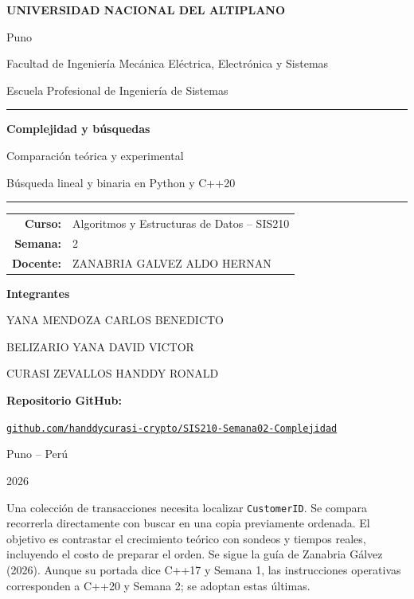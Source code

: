 \documentclass[10pt,a4paper]{article}
\newcommand{\titulo}[1]{\vspace{3pt}{\large\bfseries\color{azul}#1}\par}
\begin{document}
\hypersetup{pageanchor=false}
\begin{titlepage}
\centering
{\Large\bfseries UNIVERSIDAD NACIONAL DEL ALTIPLANO\par}
\vspace{0.25cm}
{\large Puno\par}
\vspace{0.7cm}
Facultad de Ingeniería Mecánica Eléctrica, Electrónica y Sistemas\par
Escuela Profesional de Ingeniería de Sistemas\par
\vspace{2.2cm}
{\color{azul}\rule{\textwidth}{1.2pt}}\par
\vspace{0.5cm}
{\Huge\bfseries\color{azul}Complejidad y búsquedas\par}
\vspace{0.5cm}
{\Large Comparación teórica y experimental\par}
{\large Búsqueda lineal y binaria en Python y C++20\par}
\vspace{0.5cm}
{\color{azul}\rule{\textwidth}{1.2pt}}\par
\vspace{1.5cm}
\begin{tabular}{rl}
\textbf{Curso:}&Algoritmos y Estructuras de Datos -- SIS210\\[6pt]
\textbf{Semana:}&2\\[6pt]
\textbf{Docente:}&ZANABRIA GALVEZ ALDO HERNAN
\end{tabular}
\vspace{1.1cm}
\par\textbf{Integrantes}\par
YANA MENDOZA CARLOS BENEDICTO\par
BELIZARIO YANA DAVID VICTOR\par
CURASI ZEVALLOS HANDDY RONALD\par
\vspace{0.8cm}
\textbf{Repositorio GitHub:}\par
\href{https://github.com/handdycurasi-crypto/SIS210-Semana02-Complejidad}{\texttt{github.com/handdycurasi-crypto/SIS210-Semana02-Complejidad}}\par
\vfill
{\large Puno -- Perú\par 2026\par}
\end{titlepage}
\setcounter{page}{1}
\hypersetup{pageanchor=true}
\titulo{1. Problema y objetivo}
Una colección de transacciones necesita localizar \texttt{CustomerID}. Se compara recorrerla directamente con buscar en una copia previamente ordenada. El objetivo es contrastar el crecimiento teórico con sondeos y tiempos reales, incluyendo el costo de preparar el orden. Se sigue la guía de Zanabria Gálvez (2026). Aunque su portada dice C++17 y Semana 1, las instrucciones operativas corresponden a C++20 y Semana 2; se adoptan estas últimas.
\end{document}
